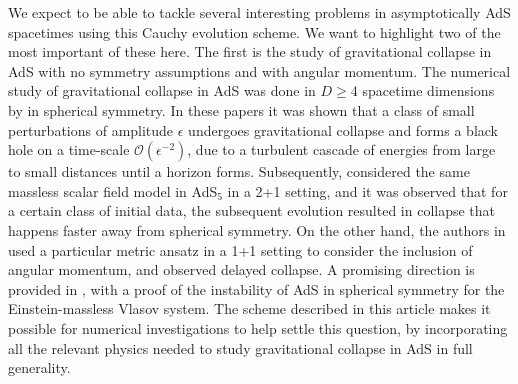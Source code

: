 \documentclass[aps,letterpaper,twocolumn,nofootinbib]{revtex4}
\numberwithin{equation}{section}
\begin{document}
We expect to be able to tackle several interesting problems in asymptotically AdS spacetimes using this Cauchy evolution scheme.
We want to highlight two of the most important of these here.
The first is the study of gravitational collapse in AdS with no symmetry assumptions and with angular momentum.
The numerical study of gravitational collapse in AdS was done in $D\geq 4$ spacetime dimensions by \cite{Bizon:2011gg,Jalmuzna:2011qw} in spherical symmetry. 
In these papers it was shown that a class of small perturbations of amplitude $\epsilon$ undergoes gravitational collapse and forms a black hole on a time-scale $\mathcal{O}(\epsilon^{-2})$, due to a turbulent cascade of energies from large to small distances until a horizon forms.
Subsequently, \cite{Bantilan:2017kok} considered the same massless scalar field model in AdS$_5$ in a 2+1 setting, and it was observed that for a certain class of initial data, the subsequent evolution resulted in collapse that happens faster away from spherical symmetry.
On the other hand, the authors in \cite{Choptuik:2017cyd} used a particular metric ansatz in a 1+1 setting to consider the inclusion of angular momentum, and observed delayed collapse.
A promising direction is provided in \cite{Moschidis:2018ruk}, \cite{Moschidis:2018kcf} with a proof of the instability of AdS in spherical symmetry for the Einstein-massless Vlasov system.
The scheme described in this article makes it possible for numerical investigations to help settle this question, by incorporating all the relevant physics needed to study gravitational collapse in AdS in full generality.
\end{document}
